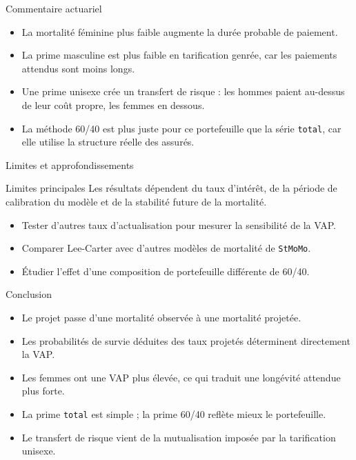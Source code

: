 \documentclass[11pt,aspectratio=169]{beamer}
\begin{document}
\begin{frame}{Commentaire actuariel}
  \begin{itemize}
    \item La mortalité féminine plus faible augmente la durée probable de paiement.
    \item La prime masculine est plus faible en tarification genrée, car les paiements attendus sont moins longs.
    \item Une prime unisexe crée un transfert de risque : les hommes paient au-dessus de leur coût propre, les femmes en dessous.
    \item La méthode 60/40 est plus juste pour ce portefeuille que la série \texttt{total}, car elle utilise la structure réelle des assurés.
  \end{itemize}
\end{frame}

\begin{frame}{Limites et approfondissements}
  \begin{block}{Limites principales}
    Les résultats dépendent du taux d'intérêt, de la période de calibration du modèle et de la stabilité future de la mortalité.
  \end{block}

  \vspace{0.12cm}
  \begin{itemize}
    \item Tester d'autres taux d'actualisation pour mesurer la sensibilité de la VAP.
    \item Comparer Lee-Carter avec d'autres modèles de mortalité de \texttt{StMoMo}.
    \item Étudier l'effet d'une composition de portefeuille différente de 60/40.
  \end{itemize}
\end{frame}

\begin{frame}{Conclusion}
  \begin{itemize}
    \item Le projet passe d'une mortalité observée à une mortalité projetée.
    \item Les probabilités de survie déduites des taux projetés déterminent directement la VAP.
    \item Les femmes ont une VAP plus élevée, ce qui traduit une longévité attendue plus forte.
    \item La prime \texttt{total} est simple ; la prime 60/40 reflète mieux le portefeuille.
    \item Le transfert de risque vient de la mutualisation imposée par la tarification unisexe.
  \end{itemize}
\end{frame}
\end{document}
